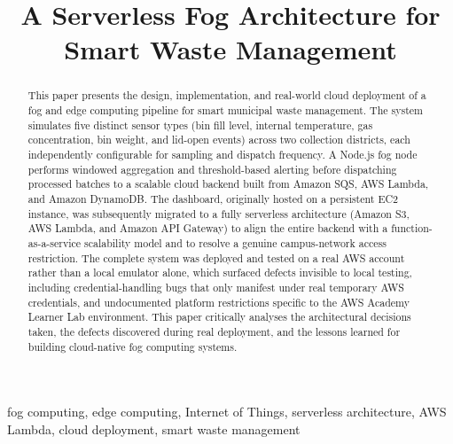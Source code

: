\documentclass[conference]{IEEEtran}
\begin{document}
\title{A Serverless Fog Architecture for Smart Waste Management}

\author{
}

\maketitle
{}

\begin{abstract}
This paper presents the design, implementation, and real-world cloud deployment of a fog and edge computing pipeline for smart municipal waste management. The system simulates five distinct sensor types (bin fill level, internal temperature, gas concentration, bin weight, and lid-open events) across two collection districts, each independently configurable for sampling and dispatch frequency. A Node.js fog node performs windowed aggregation and threshold-based alerting before dispatching processed batches to a scalable cloud backend built from Amazon SQS, AWS Lambda, and Amazon DynamoDB. The dashboard, originally hosted on a persistent EC2 instance, was subsequently migrated to a fully serverless architecture (Amazon S3, AWS Lambda, and Amazon API Gateway) to align the entire backend with a function-as-a-service scalability model and to resolve a genuine campus-network access restriction. The complete system was deployed and tested on a real AWS account rather than a local emulator alone, which surfaced defects invisible to local testing, including credential-handling bugs that only manifest under real temporary AWS credentials, and undocumented platform restrictions specific to the AWS Academy Learner Lab environment. This paper critically analyses the architectural decisions taken, the defects discovered during real deployment, and the lessons learned for building cloud-native fog computing systems.
\end{abstract}

\begin{IEEEkeywords}
fog computing, edge computing, Internet of Things, serverless architecture, AWS Lambda, cloud deployment, smart waste management
\end{IEEEkeywords}
\end{document}
